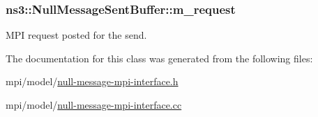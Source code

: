 \subsubsection[{\texorpdfstring{m\+\_\+request}{m_request}}]{ ns3\+::\+Null\+Message\+Sent\+Buffer\+::m\+\_\+request\hspace{0.3cm}{\ttfamily [private]}}\hypertarget{classns3_1_1NullMessageSentBuffer_a1b4004581de309f11191e7085aa529a5}{}\label{classns3_1_1NullMessageSentBuffer_a1b4004581de309f11191e7085aa529a5}
M\+PI request posted for the send. 

The documentation for this class was generated from the following files\+:\begin{DoxyCompactItemize}
\item 
mpi/model/\hyperlink{null-message-mpi-interface_8h}{null-\/message-\/mpi-\/interface.\+h}\item 
mpi/model/\hyperlink{null-message-mpi-interface_8cc}{null-\/message-\/mpi-\/interface.\+cc}\end{DoxyCompactItemize}
